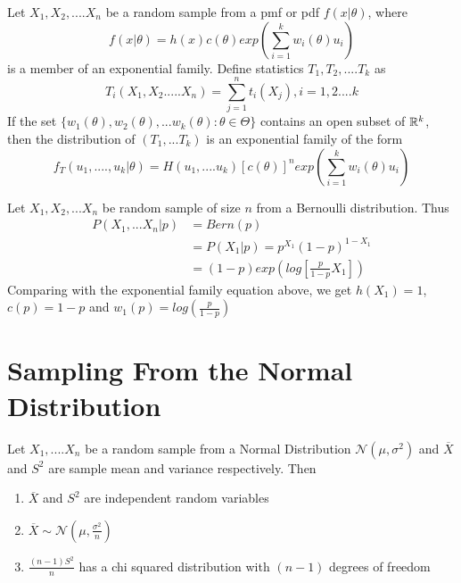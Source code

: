 \documentclass[a4paper,english,12pt]{article}
\begin{document}
\begin{thm}
Let $X_1,X_2,....X_n$ be a random sample from a pmf or pdf $f(x|\theta)$, where 
$$ f(x|\theta)=h(x)c(\theta)exp\left(\sum_{i=1}^{k}w_i(\theta)u_i\right)$$ 
is a member of an exponential family. Define statistics $T_1,T_2,....T_k$ as 
$$T_i(X_1,X_2.....X_n)=\sum_{j=1}^{n}t_i(X_j),  i=1,2....k$$ 
If the set $\{w_1(\theta),w_2(\theta),...w_k(\theta):\theta\in\Theta\}$ contains an open subset of $\mathbb{R}^k$, then the distribution of $(T_1,...T_k)$ is an exponential family of the form 
$$f_T(u_1,....,u_k|\theta)=H(u_1,....u_k)[c(\theta)]^n exp\left(\sum_{i=1}^kw_i(\theta)u_i\right)$$ 
\end{thm}

\begin{exmp}

Let $X_1,X_2,...X_n$ be random sample of size $n$ from a Bernoulli distribution. Thus 
\begin{align}
P(X_1,...X_n|p)&=Bern(p)   \nonumber  \\
&=P(X_1|p)=p^{X_1}(1-p)^{1-X_1} \nonumber \\
&=(1-p)exp\left(log\left[\frac{p}{1-p}X_1\right]\right)
\end{align}
Comparing with the exponential family equation above, we get $h(X_1)=1$,  $c(p)=1-p$ and $w_1(p)=log(\frac{p}{1-p})$

\end{exmp}

\section{Sampling From the Normal Distribution}
\begin{thm}
Let $X_1,....X_n$ be a random sample from a Normal Distribution $\mathcal{N}(\mu,\sigma^2)$ and $\overline{X}$ and $S^2$ are sample mean and variance respectively. Then
\renewcommand{\labelenumi}{\alph{enumi})}
\begin{enumerate}
\item $\overline{X}$ and $S^2$ are independent random variables 
\item $\overline{X} \sim \mathcal{N}(\mu,\frac{\sigma^2}{n})$
\item $\frac{(n-1)S^2}{n}$ has a chi squared distribution with $(n-1)$ degrees of freedom 
\end{enumerate}
\end{thm}
\end{document}
